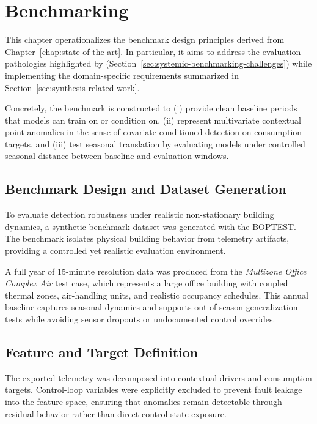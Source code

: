 \chapter{Benchmarking}
\label{chap:benchmarking}

This chapter operationalizes the benchmark design principles derived from Chapter~\ref{chap:state-of-the-art}. In particular, it aims to address the evaluation pathologies highlighted by \textcite{liu2024elephant} (Section~\ref{sec:systemic-benchmarking-challenges}) while implementing the domain-specific requirements summarized in Section~\ref{sec:synthesis-related-work}.

Concretely, the benchmark is constructed to (i) provide clean baseline periods that models can train on or condition on, (ii) represent multivariate contextual point anomalies in the sense of covariate-conditioned detection on consumption targets, and (iii) test seasonal translation by evaluating models under controlled seasonal distance between baseline and evaluation windows.

\section{Benchmark Design and Dataset Generation}
\label{sec:benchmark-design}

To evaluate detection robustness under realistic non-stationary building dynamics, a synthetic benchmark dataset was generated with the \ac{BOPTEST}\parencite{Blum03092021}. The benchmark isolates physical building behavior from telemetry artifacts, providing a controlled yet realistic evaluation environment.

A full year of 15-minute resolution data was produced from the \textit{Multizone Office Complex Air} test case\parencite{BOPTESTMultizoneOfficeComplexAir}, which represents a large office building with coupled thermal zones, air-handling units, and realistic occupancy schedules. This annual baseline captures seasonal dynamics and supports out-of-season generalization tests while avoiding sensor dropouts or undocumented control overrides.

\section{Feature and Target Definition}
\label{sec:benchmark-features}

The exported telemetry was decomposed into contextual drivers and consumption targets. Control-loop variables were explicitly excluded to prevent fault leakage into the feature space, ensuring that anomalies remain detectable through residual behavior rather than direct control-state exposure.

